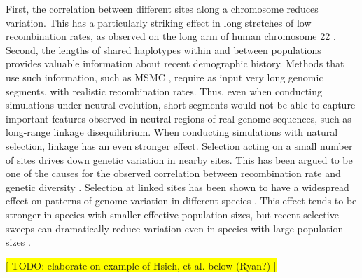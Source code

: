 \documentclass{article}
\begin{document}
First, the correlation between different sites along a chromosome reduces
variation. This has a particularly striking effect in long stretches of
low recombination rates, as observed on the long arm of human chromosome 22 \citep{Dawson2002}.
Second, the lengths of shared haplotypes within and
between populations provides valuable information about recent demographic history.
Methods that use such information, such as MSMC \citep{Schiffels2020}, require as
input very long genomic segments, with realistic recombination rates.
Thus, even when conducting simulations under neutral evolution, short segments
would not be able to capture important features observed in neutral regions of
real genome sequences, such as long-range linkage disequilibrium.
%
When conducting simulations with natural selection, linkage has
an even stronger effect. Selection acting on a small number of sites drives down
genetic variation in nearby sites. This has been argued to be one of the causes
for the observed correlation between recombination rate and genetic diversity
\citep{Begun1992}. Selection at linked sites has been shown to have a widespread
effect on patterns of genome variation in different species \citep{McVicker2009,Charlesworth2012}. This effect tends to be stronger in species
with smaller effective population sizes, but recent selective sweeps can dramatically
reduce variation even in species with large population sizes \citep{Lynd2010}.
%
%
%

\noindent\colorbox{yellow}{[ TODO: elaborate on example of Hsieh, et al. below (Ryan?) ]}
\end{document}
